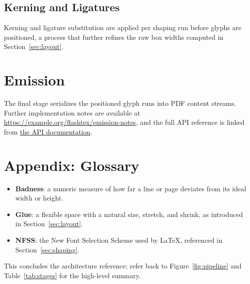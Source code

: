 \documentclass[11pt]{article}
\begin{document}
\subsection{Kerning and Ligatures}

Kerning and ligature substitution are applied per shaping run before glyphs
are positioned, a process that further refines the raw box widths computed
in Section~\ref{sec:layout}.

\section{Emission}
\label{sec:emission}

The final stage serializes the positioned glyph runs into PDF content
streams. Further implementation notes are available at
\url{https://example.org/flashtex/emission-notes}, and the full API
reference is linked from \href{https://example.org/flashtex/api}{the API
documentation}.

\section{Appendix: Glossary}
\label{sec:appendix}

\begin{itemize}
  \item \textbf{Badness}: a numeric measure of how far a line or page
        deviates from its ideal width or height.
  \item \textbf{Glue}: a flexible space with a natural size, stretch, and
        shrink, as introduced in Section~\ref{sec:layout}.
  \item \textbf{NFSS}: the New Font Selection Scheme used by \LaTeX{},
        referenced in Section~\ref{sec:shaping}.
\end{itemize}

This concludes the architecture reference; refer back to
Figure~\ref{fig:pipeline} and Table~\ref{tab:stages} for the high-level
summary.
\end{document}
